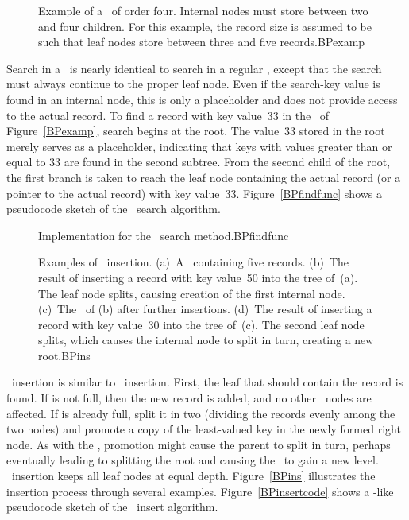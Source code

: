 \begin{figure}
\vspace{-\bigskipamount}

{Example of a \BPtree\ of order four.
Internal nodes must store between two and four children.
For this example, the record size is assumed to be such that
leaf nodes store between three and five records.}{BPexamp}
\bigskip
\end{figure}

Search in a \BPtree\ is nearly identical to search in a regular
\Btree, except that the search must always continue to the proper
leaf node.
Even if the search-key value is found in an internal node, this is
only a placeholder and does not provide access to the actual record.
To find a record with key value~33 in the \BPtree\ of
Figure~\ref{BPexamp}, search begins at the root.
The value~33 stored in the root merely serves as a placeholder,
indicating that keys with values greater than or equal to 33 are found
in the second subtree.
From the second child of the root, the first branch is taken to reach
the leaf node containing the actual record (or a pointer to the actual
record) with key value~33.
Figure~\ref{BPfindfunc} shows a pseudocode sketch of the
\BPtree\ search algorithm.

\begin{figure}
\vspace{-\bigskipamount}

{Implementation for the \BPtree\ search method.}{BPfindfunc}
\end{figure}

\begin{figure}
\vspace{-\medskipamount}

{Examples of \BPtree\ insertion.
(a)~A \BPtree\ containing five records.
(b)~The result of inserting a record with key value~50 into the tree
of~(a).
The leaf node splits, causing creation of the first internal node.
(c)~The \BPtree\ of (b) after further insertions.
(d)~The result of inserting a record with key value~30 into the tree
of~(c).
The second leaf node splits, which causes the internal node to split
in turn, creating a new root.}{BPins}
\bigskip
\end{figure}

\BPtree\ insertion is similar to \Btree\ insertion.
First, the leaf  that should contain the record is found.
If  is not full, then the new record is added, and no
other \BPtree\ nodes are affected.
If  is already full, split it in two (dividing the records
evenly among the two nodes) and promote a copy of the
least-valued key in the newly formed right node.
As with the \TTtree, promotion might cause
the parent to split in turn, perhaps eventually leading to splitting
the root and causing the \BPtree\ to gain a new level.
\BPtree\ insertion keeps all leaf nodes at equal depth.
Figure~\ref{BPins} illustrates the insertion process through several
examples.
Figure~\ref{BPinsertcode} shows a \Lang-like pseudocode sketch of the \BPtree\
insert algorithm.

